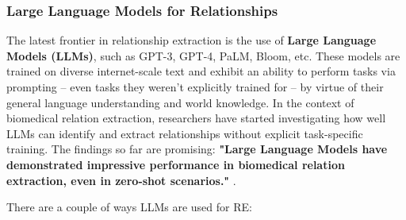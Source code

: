 \subsubsection{Large Language Models for Relationships}

The latest frontier in relationship extraction is the use of \textbf{Large Language Models (LLMs)}, such as GPT-3, GPT-4, PaLM, Bloom, etc. These models are trained on diverse internet-scale text and exhibit an ability to perform tasks via prompting – even tasks they weren't explicitly trained for – by virtue of their general language understanding and world knowledge. In the context of biomedical relation extraction, researchers have started investigating how well LLMs can identify and extract relationships without explicit task-specific training. The findings so far are promising: \textbf{"Large Language Models have demonstrated impressive performance in biomedical relation extraction, even in zero-shot scenarios."} \cite{Laskar2025}.

There are a couple of ways LLMs are used for RE:

